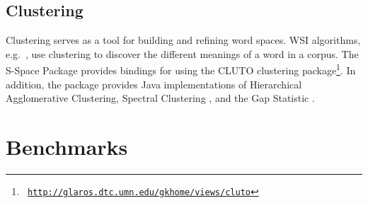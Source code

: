\subsection{Clustering}

Clustering serves as a tool for building and refining word spaces.  WSI
algorithms, e.g.\  \cite{purandare04word}, use clustering to discover the
different meanings of a word in a corpus. The S-Space Package provides bindings
for using the CLUTO clustering package\footnote{\texttt{\scriptsize
    \url{http://glaros.dtc.umn.edu/gkhome/views/cluto}}}.  In addition, the
package provides Java implementations of Hierarchical Agglomerative Clustering,
Spectral Clustering \cite{kannan04clusterings}, and the Gap Statistic
\cite{tibshirani00estimating}.

\section{Benchmarks}
\label{sec:benchmarks}

